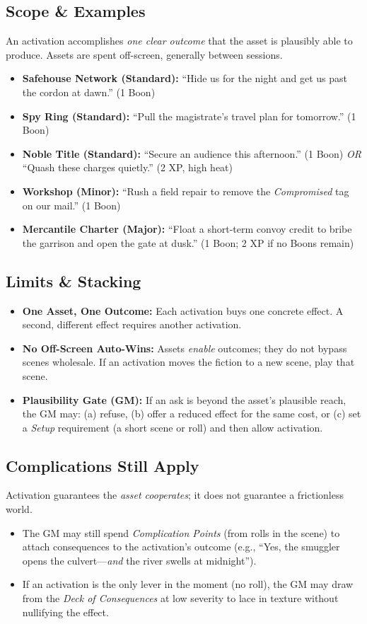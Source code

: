 \documentclass[12pt]{book}
\begin{document}
\subsection*{Scope \& Examples}
An activation accomplishes \emph{one clear outcome} that the asset is plausibly able to produce. Assets are spent off-screen, generally between sessions.
\begin{itemize}
  \item \textbf{Safehouse Network (Standard):} ``Hide us for the night and get us past the cordon at dawn.'' (1 Boon)
  \item \textbf{Spy Ring (Standard):} ``Pull the magistrate’s travel plan for tomorrow.'' (1 Boon)
  \item \textbf{Noble Title (Standard):} ``Secure an audience this afternoon.'' (1 Boon) \emph{OR} ``Quash these charges quietly.'' (2 XP, high heat)
  \item \textbf{Workshop (Minor):} ``Rush a field repair to remove the \emph{Compromised} tag on our mail.'' (1 Boon)
  \item \textbf{Mercantile Charter (Major):} ``Float a short-term convoy credit to bribe the garrison and open the gate at dusk.'' (1 Boon; 2 XP if no Boons remain)
\end{itemize}

\subsection*{Limits \& Stacking}
\begin{itemize}
  \item \textbf{One Asset, One Outcome:} Each activation buys one concrete effect. A second, different effect requires another activation.
  \item \textbf{No Off-Screen Auto-Wins:} Assets \emph{enable} outcomes; they do not bypass scenes wholesale. If an activation moves the fiction to a new scene, play that scene.
  \item \textbf{Plausibility Gate (GM):} If an ask is beyond the asset’s plausible reach, the GM may: (a) refuse, (b) offer a reduced effect for the same cost, or (c) set a \emph{Setup} requirement (a short scene or roll) and then allow activation.
\end{itemize}

\subsection*{Complications Still Apply}
Activation guarantees the \emph{asset cooperates}; it does not guarantee a frictionless world.
\begin{itemize}
  \item The GM may still spend \emph{Complication Points} (from rolls in the scene) to attach consequences to the activation’s outcome (e.g., ``Yes, the smuggler opens the culvert—\emph{and} the river swells at midnight'').
  \item If an activation is the only lever in the moment (no roll), the GM may draw from the \emph{Deck of Consequences} at low severity to lace in texture without nullifying the effect.
\end{itemize}
\end{document}
